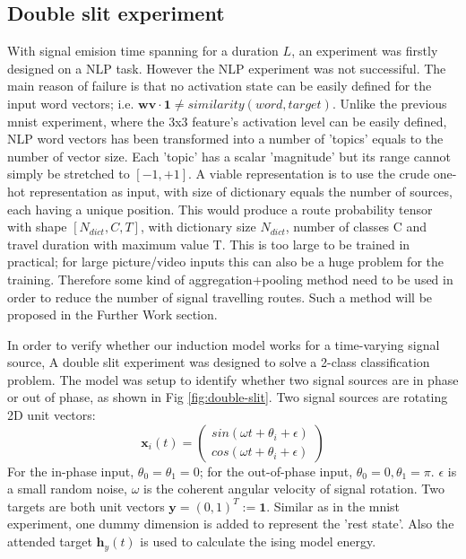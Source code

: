 \documentclass[11pt,a4paper]{article}
\begin{document}
\clearpage 
\begin{multicols}{2}
  \subsection{Double slit experiment}
  With signal emision time spanning for a duration $L$, an experiment was firstly designed on a NLP task. 
  However the NLP experiment was not successiful. The main reason of failure is that no activation state can be easily defined for the input word vectors; i.e. 
  $\boldsymbol{wv} \cdot \boldsymbol{1} \neq similarity(word, target)$. Unlike the previous mnist experiment, where the 3x3 feature's activation level can be easily defined, 
  NLP word vectors has been transformed into a number of 'topics' equals to the number of vector size. Each 'topic' has a scalar 'magnitude' but its range cannot simply be stretched to $[-1, +1]$. 
  A viable representation is to use the crude one-hot representation as input, with size of dictionary equals the number of sources, each having a unique position. 
  This would produce a route probability tensor with shape $[N_{dict}, C, T]$, with dictionary size $N_{dict}$, number of classes C and travel duration with maximum value T. This is too large to be trained in practical; 
  for large picture/video inputs this can also be a huge problem for the training.
  Therefore some kind of aggregation+pooling method need to be used in order to reduce the number of signal travelling routes. Such a method will be proposed in the Further Work section. 

  In order to verify whether our induction model works for a time-varying signal source, A double slit experiment was designed to solve a 2-class classification problem. 
  The model was setup to identify whether two signal sources are in phase or out of phase, as shown in Fig \ref{fig:double-slit}. Two signal sources are rotating 2D unit vectors: 
  $$
  \boldsymbol{x}_{i}(t) = \left(
  \begin{array}{rcl}
  sin(\omega t + \theta_i + \epsilon)\\
  cos(\omega t + \theta_i + \epsilon)
  \end{array}
  \right)
  $$
  For the in-phase input, $\theta_0=\theta_1=0$; for the out-of-phase input, $\theta_0=0, \theta_1=\pi$. $\epsilon$ is a small random noise, $\omega$ is the coherent angular velocity of signal rotation. 
  Two targets are both unit vectors $\boldsymbol{y}=(0, 1)^T:=\boldsymbol{1}$. Similar as in the mnist experiment, one dummy dimension is added to represent the 'rest state'. Also the attended target $\boldsymbol{h}_y(t)$ is used to calculate the ising model energy.  


\end{multicols}
\end{document}
